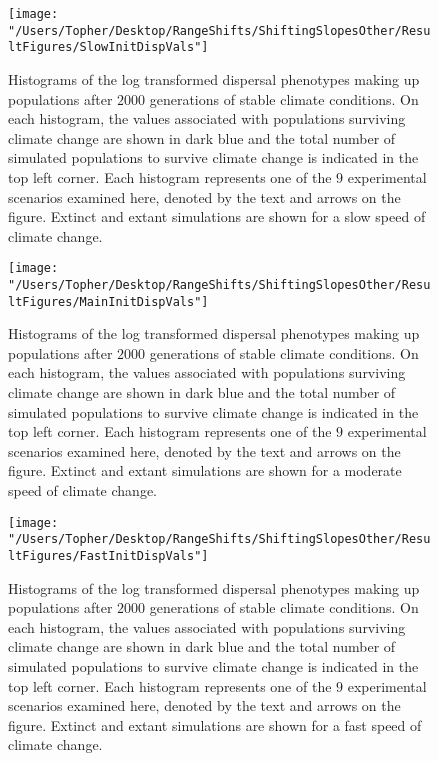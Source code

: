 \documentclass[12pt, oneside]{article}
\begin{document}
\begin{figure}
\centering
\texttt{[image: "/Users/Topher/Desktop/RangeShifts/ShiftingSlopesOther/ResultFigures/SlowInitDispVals"]}
\vspace{-5mm}
\caption[LoF entry]{Histograms of the log transformed dispersal phenotypes making up populations after $2000$ generations of stable climate conditions. On each histogram, the values associated with populations surviving climate change are shown in dark blue and the total number of simulated populations to survive climate change is indicated in the top left corner. Each histogram represents one of the $9$ experimental scenarios examined here, denoted by the text and arrows on the figure. Extinct and extant simulations are shown for a slow speed of climate change.}
\label{fig:InitDispSlow}
\end{figure}

\begin{figure}
\centering
\texttt{[image: "/Users/Topher/Desktop/RangeShifts/ShiftingSlopesOther/ResultFigures/MainInitDispVals"]}
\vspace{-5mm}
\caption[LoF entry]{Histograms of the log transformed dispersal phenotypes making up populations after $2000$ generations of stable climate conditions. On each histogram, the values associated with populations surviving climate change are shown in dark blue and the total number of simulated populations to survive climate change is indicated in the top left corner. Each histogram represents one of the $9$ experimental scenarios examined here, denoted by the text and arrows on the figure. Extinct and extant simulations are shown for a moderate speed of climate change.}
\label{fig:InitDispMain}
\end{figure}

\begin{figure}
\centering
\texttt{[image: "/Users/Topher/Desktop/RangeShifts/ShiftingSlopesOther/ResultFigures/FastInitDispVals"]}
\vspace{-5mm}
\caption[LoF entry]{Histograms of the log transformed dispersal phenotypes making up populations after $2000$ generations of stable climate conditions. On each histogram, the values associated with populations surviving climate change are shown in dark blue and the total number of simulated populations to survive climate change is indicated in the top left corner. Each histogram represents one of the $9$ experimental scenarios examined here, denoted by the text and arrows on the figure. Extinct and extant simulations are shown for a fast speed of climate change.}
\label{fig:InitDispFast}
\end{figure}
\end{document}
